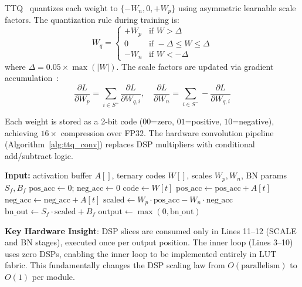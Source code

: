 \documentclass[conference]{IEEEtran}
\begin{document}
TTQ~\cite{zhu2017} quantizes each weight to $\{-W_n, 0, +W_p\}$ using asymmetric learnable scale factors. The quantization rule during training is:
\begin{equation}
W_q = \begin{cases}
    +W_p & \text{if } W > \Delta \\
    0 & \text{if } -\Delta \leq W \leq \Delta \\
    -W_n & \text{if } W < -\Delta
\end{cases}
\label{eq:ttq}
\end{equation}
where $\Delta = 0.05 \times \max(|W|)$. The scale factors are updated via gradient accumulation~\cite{zhu2017}:
\begin{equation}
\frac{\partial L}{\partial W_p} = \sum_{i \in S^+} \frac{\partial L}{\partial W_{q,i}}, \quad
\frac{\partial L}{\partial W_n} = \sum_{i \in S^-} -\frac{\partial L}{\partial W_{q,i}}
\end{equation}

Each weight is stored as a 2-bit code ($00$=zero, $01$=positive, $10$=negative), achieving $16\times$ compression over FP32. The hardware convolution pipeline (Algorithm~\ref{alg:ttq_conv}) replaces DSP multipliers with conditional add/subtract logic.

\begin{algorithm}[H]
\caption{TTQ Convolution Pipeline (Single Output Position)}
\label{alg:ttq_conv}
\begin{algorithmic}[1]
\STATE \textbf{Input:} activation buffer $A[]$, ternary codes $W[]$, scales $W_p, W_n$, BN params $S_f, B_f$
\STATE $\text{pos\_acc} \gets 0$; $\text{neg\_acc} \gets 0$
    \STATE $\text{code} \gets W[t]$ 
        \STATE $\text{pos\_acc} \gets \text{pos\_acc} + A[t]$
        \STATE $\text{neg\_acc} \gets \text{neg\_acc} + A[t]$
    \ENDIF
\ENDFOR
\STATE $\text{scaled} \gets W_p \cdot \text{pos\_acc} - W_n \cdot \text{neg\_acc}$ 
\STATE $\text{bn\_out} \gets S_f \cdot \text{scaled} + B_f$ 
\STATE $\text{output} \gets \max(0, \text{bn\_out})$ 
\end{algorithmic}
\end{algorithm}

\textbf{Key Hardware Insight}: DSP slices are consumed only in Lines 11--12 (SCALE and BN stages), executed once per output position. The inner loop (Lines 3--10) uses zero DSPs, enabling the inner loop to be implemented entirely in LUT fabric. This fundamentally changes the DSP scaling law from $O(\text{parallelism})$ to $O(1)$ per module.
\end{document}
